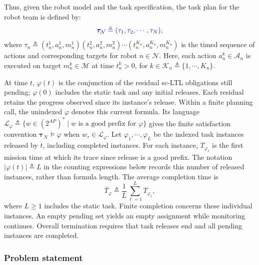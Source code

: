 Thus, given the robot model and the task specification,
the task plan for the robot team is defined by:
\begin{equation}
\color{blue}
\label{ch06:plan}
\boldsymbol{\tau}_{\mathcal{N}} \triangleq (\tau_1,\tau_2,\cdots,\tau_N),
\end{equation}
where
$\tau_n \triangleq
(t_n^1,a_n^1,m_n^1)(t_n^2,a_n^2,m_n^2)\cdots
(t_n^{K_n},a_n^{K_n},m_n^{K_n})$
is the timed sequence of actions and corresponding targets for robot
$n \in \mathcal{N}$. Here, each action $a_n^k \in \mathcal{A}_n$ is
executed on target $m_n^k \in \mathcal{M}$ at time $t_n^k > 0$, for
$k \in \mathcal{K}_n \triangleq \{1,\cdots,K_n\}$.  \begin{revision}
At time $t$, $\varphi(t)$ is the conjunction of the residual sc-LTL
obligations still pending; $\varphi(0)$ includes the static task and any
initial releases. Each residual retains the progress observed since its
instance's release. Within a finite planning call, the unindexed
$\varphi$ denotes this current formula. Its language
$\mathcal L_{\varphi}\triangleq\{w\in(2^{AP})^*\mid
w\text{ is a good prefix for }\varphi\}$ gives the finite satisfaction
convention $\boldsymbol{\tau}_{\mathcal N}\models\varphi$ when
$w_\tau\in\mathcal L_\varphi$.
Let $\varphi_1,\cdots,\varphi_L$ be the indexed task instances released by
$t$, including completed instances. For each instance, $T_{\varphi_\ell}$
is the first mission time at which its trace since release is a good prefix.
The notation $|\varphi(t)|\triangleq L$ in the counting expressions below
records this number of released instances, rather than formula length.
The average completion time is
\begin{equation}
\label{ch06:eq:avg-makespan}
\overline{T}_{\varphi} \triangleq
\frac{1}{L}\sum_{\ell=1}^{L} T_{\varphi_{\ell}},
\end{equation}
where $L\geq1$ includes the static task. Finite completion concerns these
individual instances. An empty pending set yields an empty assignment while
monitoring continues. Overall termination requires that task releases end
and all pending instances are completed.
\end{revision}

\subsubsection{Problem statement}
\label{ch06:subsec:prob-statement}

